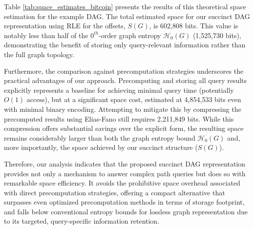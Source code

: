 Table \ref{tab:space_estimates_bitcoin} presents the results of this theoretical space estimation for the example DAG. The total estimated space for our succinct DAG representation using RLE for the offsets, $S(G)$, is 602,808 bits. This value is notably less than half of the $0^{th}$-order graph entropy $\mathcal{H}_0(G)$ (1,525,730 bits), demonstrating the benefit of storing only query-relevant information rather than the full graph topology.

Furthermore, the comparison against precomputation strategies underscores the practical advantages of our approach. Precomputing and storing all \Rank{} query results explicitly represents a baseline for achieving minimal query time (potentially $O(1)$ access), but at a significant space cost, estimated at 4,854,533 bits even with minimal binary encoding. Attempting to mitigate this by compressing the precomputed results using Elias-Fano still requires 2,211,849 bits. While this compression offers substantial savings over the explicit form, the resulting space remains considerably larger than both the graph entropy bound $\mathcal{H}_0(G)$ and, more importantly, the space achieved by our succinct structure ($S(G)$).

Therefore, our analysis indicates that the proposed succinct DAG representation provides not only a mechanism to answer complex path queries but does so with remarkable space efficiency. It avoids the prohibitive space overhead associated with direct precomputation strategies, offering a compact alternative that surpasses even optimized precomputation methods in terms of storage footprint, and falls below conventional entropy bounds for lossless graph representation due to its targeted, query-specific information retention.
